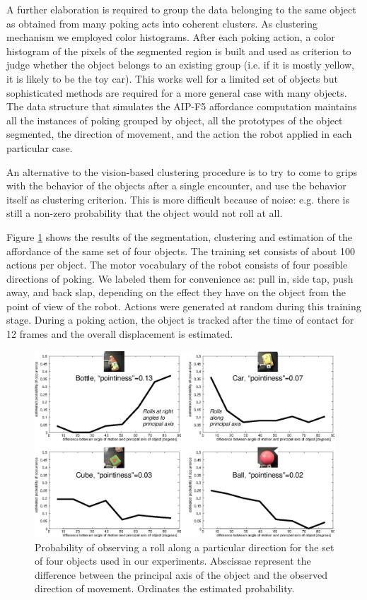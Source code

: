 A further elaboration is required to group the data belonging to the same
object as obtained from many poking acts into coherent clusters. As clustering 
mechanism we employed color histograms. After each poking action, a color histogram 
of the pixels of the segmented region is built and used as criterion 
to judge whether the object belongs to an existing group (i.e. if it
is mostly yellow, it is likely to be the toy car). This works well
for a limited set of objects but sophisticated methods are 
required for a more general case with many objects. 
The data structure that simulates the AIP-F5 affordance computation maintains all 
the instances of poking grouped by object, all the prototypes of the object segmented,
the direction of movement, and the action the robot applied in each particular case.

An alternative to the vision-based clustering procedure is to try to come 
to grips with the behavior of the objects after a single encounter, and use 
the behavior itself as clustering criterion. This is more difficult because 
of noise: e.g. there is still a non-zero probability that the object would 
not roll at all.

Figure \ref{fig:affordances} shows the results of the segmentation, clustering
and estimation of the affordance of the same set of four objects. The training set
consists of about 100 actions per object. The motor vocabulary of the robot
consists of four possible directions of poking. We labeled them for convenience
as: pull in, side tap, push away, and back slap, depending on the effect they
have on the object from the point of view of the robot. Actions were generated
at random during this training stage. During a poking action, the object is
tracked after the time of contact for 12 frames and the overall displacement is
estimated. 

\begin{figure}[tbh]
\begin{center}
\includegraphics[width=\columnwidth]{affordances.eps}
\caption{ 
\label{fig:affordances}
%
Probability of observing a roll along a particular direction for the set
of four objects used in our experiments. Abscissae represent the difference
between the principal axis of the object and the observed direction of 
movement. Ordinates the estimated probability.
%
}
\end{center}
\end{figure}

